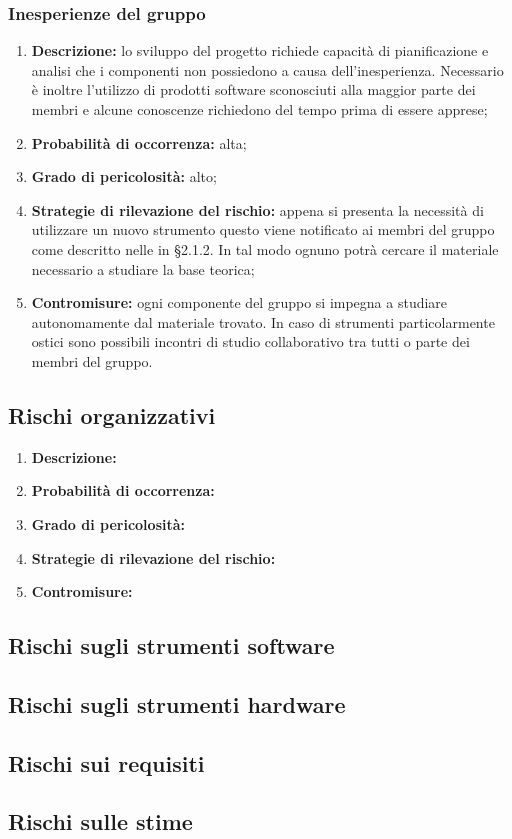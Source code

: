 \subsubsection{Inesperienze del gruppo}
\begin{enumerate}
\item \textbf{Descrizione:} lo sviluppo del progetto richiede capacità di pianificazione e analisi che i componenti non possiedono a causa dell'inesperienza. Necessario è inoltre l'utilizzo di prodotti software sconosciuti alla maggior parte dei membri e alcune conoscenze richiedono del tempo prima di essere apprese;
\item \textbf{Probabilità di occorrenza:} alta;
\item \textbf{Grado di pericolosità:} alto;
\item \textbf{Strategie di rilevazione del rischio:} appena si presenta la necessità di utilizzare un nuovo strumento questo viene notificato ai membri del gruppo come descritto nelle \NormeDiProgetto{} in §2.1.2. In tal modo ognuno potrà cercare il materiale necessario a studiare la base teorica;
\item \textbf{Contromisure:} ogni componente del gruppo si impegna a studiare autonomamente dal materiale trovato. In caso di strumenti particolarmente ostici sono possibili incontri di studio collaborativo tra tutti o parte dei membri del gruppo.
\end{enumerate}

\subsection{Rischi organizzativi}
\begin{enumerate}
\item \textbf{Descrizione:}
\item \textbf{Probabilità di occorrenza:}
\item \textbf{Grado di pericolosità:}
\item \textbf{Strategie di rilevazione del rischio:}
\item \textbf{Contromisure:}
\end{enumerate}
\subsection{Rischi sugli strumenti software}

\subsection{Rischi sugli strumenti hardware}

\subsection{Rischi sui requisiti}

\subsection{Rischi sulle stime}


